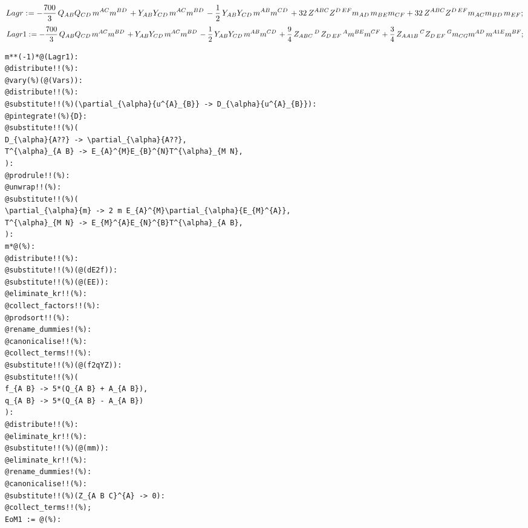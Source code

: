 \documentclass[11pt]{article}
\def\specialcolon{\mathrel{\mathop{:}}\hspace{-.5em}}
\begin{document}
\begin{dmath*}[compact, spread=2pt]
Lagr\specialcolon{}=  - \frac{700}{3}\, {Q}_{A B} {Q}_{C D\, } {m}^{A C} {m}^{B D\, } + {Y}_{A B} {Y}_{C D\, } {m}^{A C} {m}^{B D\, } - \frac{1}{2}\, {Y}_{A B} {Y}_{C D\, } {m}^{A B} {m}^{C D\, } + 32\, {Z}^{A B C} {Z}^{D\,  E F} {m}_{A D\, } {m}_{B E} {m}_{C F} + 32\, {Z}^{A B C} {Z}^{D\,  E F} {m}_{A C} {m}_{B D\, } {m}_{E F};
\end{dmath*}
\begin{dmath*}[compact, spread=2pt]
Lagr1\specialcolon{}=  - \frac{700}{3}\, {Q}_{A B} {Q}_{C D\, } {m}^{A C} {m}^{B D\, } + {Y}_{A B} {Y}_{C D\, } {m}^{A C} {m}^{B D\, } - \frac{1}{2}\, {Y}_{A B} {Y}_{C D\, } {m}^{A B} {m}^{C D\, } + \frac{9}{4}\, {Z}_{A B C}\,^{D\, } {Z}_{D\,  E F}\,^{A} {m}^{B E} {m}^{C F} + \frac{3}{4}\, {Z}_{A A1 B}\,^{C} {Z}_{D\,  E F}\,^{G} {m}_{C G} {m}^{A D\, } {m}^{A1 E} {m}^{B F};
\end{dmath*}
{\color[named]{Blue}\begin{verbatim}
m**(-1)*@(Lagr1):
@distribute!!(%):
@vary(%)(@(Vars)):
@distribute!!(%):
@substitute!!(%)(\partial_{\alpha}{u^{A}_{B}} -> D_{\alpha}{u^{A}_{B}}):
@pintegrate!(%){D}:
@substitute!!(%)(
D_{\alpha}{A??} -> \partial_{\alpha}{A??},
T^{\alpha}_{A B} -> E_{A}^{M}E_{B}^{N}T^{\alpha}_{M N},
):
@prodrule!!(%):
@unwrap!!(%):
@substitute!!(%)(
\partial_{\alpha}{m} -> 2 m E_{A}^{M}\partial_{\alpha}{E_{M}^{A}},
T^{\alpha}_{M N} -> E_{M}^{A}E_{N}^{B}T^{\alpha}_{A B},
):
m*@(%):
@distribute!!(%):
@substitute!!(%)(@(dE2f)):
@substitute!!(%)(@(EE)):
@eliminate_kr!!(%):
@collect_factors!!(%):
@prodsort!!(%):
@rename_dummies!(%):
@canonicalise!!(%):
@collect_terms!!(%):
@substitute!!(%)(@(f2qYZ)):
@substitute!!(%)(
f_{A B} -> 5*(Q_{A B} + A_{A B}),
q_{A B} -> 5*(Q_{A B} - A_{A B})
):
@distribute!!(%):
@eliminate_kr!!(%):
@substitute!!(%)(@(mm)):
@eliminate_kr!!(%):
@rename_dummies!(%):
@canonicalise!!(%):
@substitute!!(%)(Z_{A B C}^{A} -> 0):
@collect_terms!!(%);
EoM1 := @(%):
\end{verbatim}}
\end{document}
